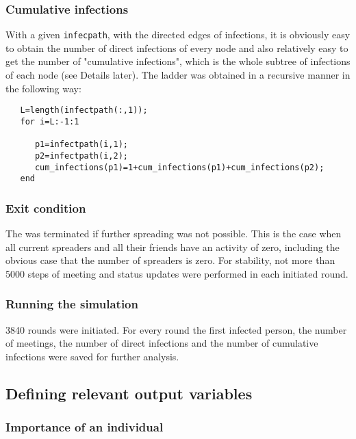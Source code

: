 \subsubsection{Cumulative infections}

With a given \texttt{infecpath}, with the directed edges of infections, it is obviously easy to obtain the number of direct infections of every node and also relatively easy to get the number of "cumulative infections", which is the whole subtree of infections of each node (see Details later). The ladder was obtained in a recursive manner in the following way:

\begin{lstlisting} 
   L=length(infectpath(:,1));
   for i=L:-1:1
      
      p1=infectpath(i,1);
      p2=infectpath(i,2);
      cum_infections(p1)=1+cum_infections(p1)+cum_infections(p2);
   end

\end{lstlisting}


\subsubsection{Exit condition}

The  was terminated if further spreading was not possible. This is the case when all current spreaders and all their friends have an activity of zero, including the obvious case that the number of spreaders is zero. For stability, not more than 5000 steps of meeting and status updates were performed in each initiated round.

\subsubsection{Running the simulation}
3840 rounds were initiated. For every round the first infected person, the number of meetings, the number of direct infections and the number of cumulative infections were saved for further analysis.

\subsection{Defining relevant output variables}

\subsubsection{Importance of an individual}

